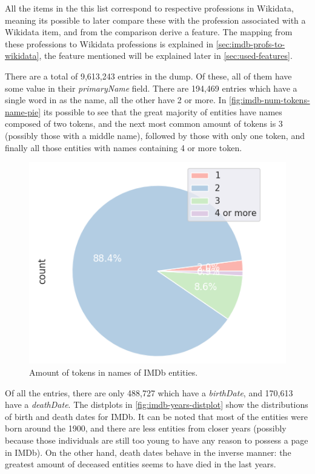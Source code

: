 \documentclass[epsfig,a4paper,11pt,titlepage,twoside,openany]{book}
\begin{document}
All the items in the this list correspond to respective professions in Wikidata, meaning its possible to later compare these with the profession associated with a Wikidata item, and from the comparison derive a feature. The mapping from these professions to Wikidata professions is explained in \autoref{sec:imdb-profs-to-wikidata}, the feature mentioned will be explained later in \autoref{sec:used-features}.

There are a total of 9,613,243 entries in the dump. Of these, all of them have some value in their \textit{primaryName} field. There are 194,469 entries which have a single word in as the name, all the other have 2 or more. In \autoref{fig:imdb-num-tokens-name-pie} its possible to see that the great majority of entities have names composed of two tokens, and the next most common amount of tokens is 3 (possibly those with a middle name), followed by those with only one token, and finally all those entities with names containing 4 or more token.

\begin{figure}[]
  \centering \includegraphics[width=.6\textwidth]{imdb_num_tokens_names}
  \caption{Amount of tokens in names of IMDb entities.}
  \label{fig:imdb-num-tokens-name-pie}
\end{figure}


Of all the entries, there are only 488,727 which have a \textit{birthDate}, and 170,613 have a \textit{deathDate}. The distplots in \autoref{fig:imdb-years-distplot} show the distributions of birth and death dates for IMDb. It can be noted that most of the entities were born around the 1900, and there are less entities from closer years (possibly because those individuals are still too young to have any reason to possess a page in IMDb). On the other hand, death dates behave in the inverse manner: the greatest amount of deceased entities seems to have died in the last years.
\end{document}
